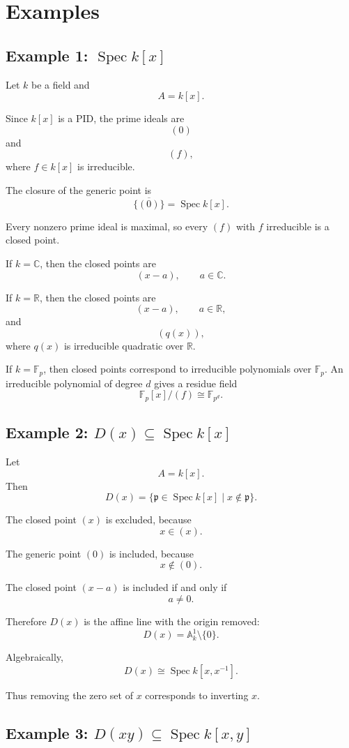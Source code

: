 \documentclass[12pt,a4paper]{article}
\newcommand{\R}{\mathbb{R}}
\newcommand{\C}{\mathbb{C}}
\newcommand{\Spec}{\operatorname{Spec}}
\newcommand{\Fp}{\mathbb F_p}
\newcommand{\A}{\mathbb A}
\newcommand{\mfp}{\mathfrak p}
\begin{document}
\section{Examples}

\subsection{Example 1: \(\Spec k[x]\)}

Let \(k\) be a field and
\[
A=k[x].
\]

Since \(k[x]\) is a PID, the prime ideals are
\[
(0)
\]
and
\[
(f),
\]
where \(f\in k[x]\) is irreducible.

The closure of the generic point is
\[
\overline{\{(0)\}}=\Spec k[x].
\]

Every nonzero prime ideal is maximal, so every \((f)\) with \(f\) irreducible is
a closed point.

If \(k=\C\), then the closed points are
\[
(x-a),\qquad a\in\C.
\]

If \(k=\R\), then the closed points are
\[
(x-a),\qquad a\in\R,
\]
and
\[
(q(x)),
\]
where \(q(x)\) is irreducible quadratic over \(\R\).

If \(k=\Fp\), then closed points correspond to irreducible polynomials over
\(\Fp\). An irreducible polynomial of degree \(d\) gives a residue field
\[
\Fp[x]/(f)\cong \mathbb F_{p^d}.
\]

\subsection{Example 2: \(D(x)\subseteq \Spec k[x]\)}

Let
\[
A=k[x].
\]
Then
\[
D(x)=\{\mfp\in\Spec k[x]\mid x\notin\mfp\}.
\]

The closed point \((x)\) is excluded, because
\[
x\in(x).
\]

The generic point \((0)\) is included, because
\[
x\notin(0).
\]

The closed point \((x-a)\) is included if and only if
\[
a\neq 0.
\]

Therefore \(D(x)\) is the affine line with the origin removed:
\[
D(x)=\A^1_k\setminus\{0\}.
\]

Algebraically,
\[
D(x)\cong \Spec k[x,x^{-1}].
\]

Thus removing the zero set of \(x\) corresponds to inverting \(x\).

\subsection{Example 3: \(D(xy)\subseteq \Spec k[x,y]\)}
\end{document}
